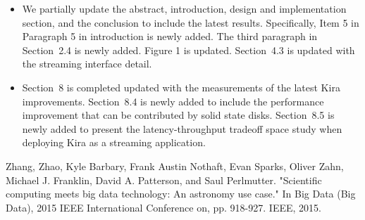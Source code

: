 \documentclass[10pt,a4paper]{article}
\begin{document}
\begin{itemize}
\item{} We partially update the abstract, introduction, design and implementation section, and the conclusion to include the latest results.
Specifically, Item 5 in Paragraph 5 in introduction is newly added.
The third paragraph in Section~2.4 is newly added.
Figure 1 is updated.
Section~4.3 is updated with the streaming interface detail.

\item{} Section~8 is completed updated with the measurements of the latest Kira improvements.
Section~8.4 is newly added to include the performance improvement that can be contributed by solid state disks.
Section~8.5 is newly added to present the latency-throughput tradeoff space study when deploying Kira as a streaming application.
\end{itemize}


\begin{thebibliography}{1}

Zhang, Zhao, Kyle Barbary, Frank Austin Nothaft, Evan Sparks, Oliver Zahn, Michael J. Franklin, David A. Patterson, and Saul Perlmutter. "Scientific computing meets big data technology: An astronomy use case." In Big Data (Big Data), 2015 IEEE International Conference on, pp. 918-927. IEEE, 2015.
\end{thebibliography}
\end{document}
